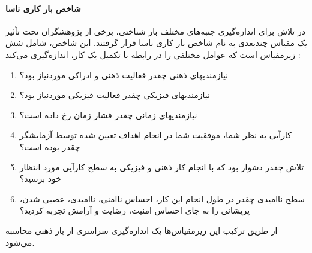 \paragraph{شاخص بار کاری ناسا}
در تلاش برای اندازه‌گيری جنبه‌های مختلف بار شناختی، برخی از پژوهشگران تحت تأثير یک مقياس
چندبعدی به نام شاخص بار كاری ناسا 
قرار گرفتند.
\cite{hart1988development}
این شاخص، شامل شش زیرمقياس است كه 
عوامل مختلفی را  در رابطه با تکميل یک كار، اندازه‌گيری می‌كند :
\begin{enumerate}
	\item نيازمندیهای ذهنی
	 چقدر 
	فعاليت ذهنی و  ادراكی موردنياز بود؟
	\item نيازمندیهای فيزیکی 
	چقدر  فعاليت فيزیکی موردنياز
	بود؟
	\item نيازمندیهای زمانی 
	چقدر فشار زمان رخ داده است؟
	\item كارآیی به نظر شما، موفقيت
	شما در انجام اهداف تعيين شده توسط آزمایشگر چقدر بوده است؟
	\item تلاش چقدر دشوار بود كه با 
	انجام كار ذهنی و فيزیکی به سطح كارآیی مورد انتظار خود برسيد؟
	\item سطح نااميدی 
	چقدر در طول 
	انجام این كار، احساس ناامنی، نااميدی، عصبی شدن، پریشانی را  به جای احساس امنيت، رضایت و 
	آرامش تجربه كردید؟ 
\end{enumerate}
از طریق تركيب این زیرمقياس‌ها یک اندازه‌گيری سراسری از بار ذهنی محاسبه 
می‌شود.
\cite{antonenko2010using}
\\
